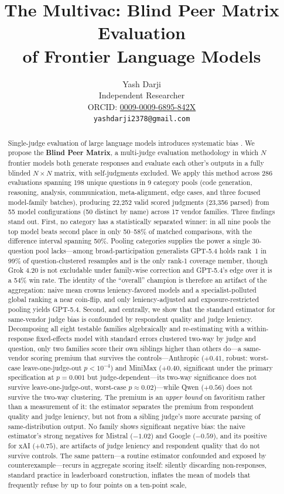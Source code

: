 \documentclass{article}
\title{The Multivac: Blind Peer Matrix Evaluation\\of Frontier Language Models}
\author{
  Yash Darji \\
  Independent Researcher \\
  ORCID: \href{https://orcid.org/0009-0009-6895-842X}{0009-0009-6895-842X} \\
  \texttt{yashdarji2378@gmail.com}
}
\begin{document}
\maketitle

\begin{abstract}
Single-judge evaluation of large language models introduces systematic bias \citep{zheng2023judging}. We propose the \textbf{Blind Peer Matrix}, a multi-judge evaluation methodology in which $N$ frontier models both generate responses and evaluate each other's outputs in a fully blinded $N \times N$ matrix, with self-judgments excluded. We apply this method across 286 evaluations spanning 198 unique questions in 9 category pools (code generation, reasoning, analysis, communication, meta-alignment, edge cases, and three focused model-family batches), producing 22,252 valid scored judgments (23,356 parsed) from 55 model configurations (50 distinct by name) across 17 vendor families. Three findings stand out. First, no category has a statistically separated winner: in all nine pools the top model beats second place in only 50--58\% of matched comparisons, with the difference interval spanning 50\%. Pooling categories supplies the power a single 30-question pool lacks---among broad-participation generalists GPT-5.4 holds rank~1 in 99\% of question-clustered resamples and is the only rank-1 coverage member, though Grok 4.20 is not excludable under family-wise correction and GPT-5.4's edge over it is a 54\% win rate. The identity of the ``overall'' champion is therefore an artifact of the aggregation: naive mean crowns leniency-favored models and a specialist-polluted global ranking a near coin-flip, and only leniency-adjusted and exposure-restricted pooling yields GPT-5.4. Second, and centrally, we show that the standard estimator for same-vendor judge bias is confounded by respondent quality and judge leniency. Decomposing all eight testable families algebraically and re-estimating with a within-response fixed-effects model with standard errors clustered two-way by judge and question, only two families score their own siblings higher than others do---a same-vendor scoring premium that survives the controls---Anthropic ($+0.41$, robust: worst-case leave-one-judge-out $p < 10^{-4}$) and MiniMax ($+0.40$, significant under the primary specification at $p = 0.001$ but judge-dependent---its two-way significance does not survive leave-one-judge-out, worst-case $p \approx 0.02$)---while Qwen ($+0.56$) does not survive the two-way clustering. The premium is an \emph{upper bound} on favoritism rather than a measurement of it: the estimator separates the premium from respondent quality and judge leniency, but not from a sibling judge's more accurate parsing of same-distribution output. No family shows significant negative bias: the naive estimator's strong negatives for Mistral ($-1.02$) and Google ($-0.59$), and its positive for xAI ($+0.75$), are artifacts of judge leniency and respondent quality that do not survive controls. The same pattern---a routine estimator confounded and exposed by counterexample---recurs in aggregate scoring itself: silently discarding non-responses, standard practice in leaderboard construction, inflates the mean of models that frequently refuse by up to four points on a ten-point scale, 
\end{abstract}
\end{document}

